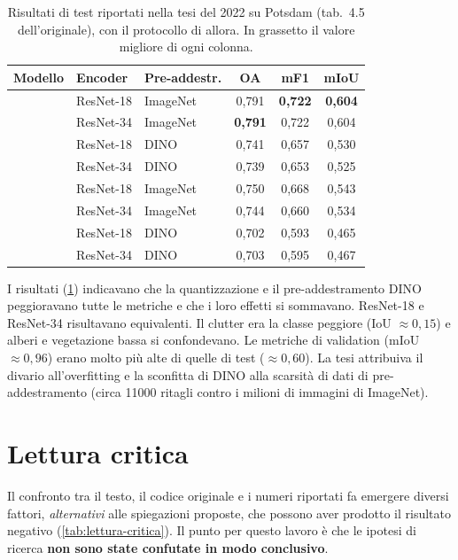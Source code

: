 \begin{table}[t]
  \centering
  \small
  \caption[Risultati di test della tesi del 2022]{Risultati di test riportati nella tesi del
    2022 su Potsdam (tab.~4.5 dell'originale), con il protocollo di allora. In grassetto il
    valore migliore di ogni colonna.}
  \label{tab:risultati-2022}
  \begin{tabular}{|l|l|l|c|c|c|}
    \hline
    \textbf{Modello} & \textbf{Encoder} & \textbf{Pre-addestr.} & \textbf{OA} & \textbf{mF1} & \textbf{mIoU} \\
    \hline
    \maresunet{}   & ResNet-18 & ImageNet & 0,791 & \textbf{0,722} & \textbf{0,604} \\
    \maresunet{}   & ResNet-34 & ImageNet & \textbf{0,791} & 0,722 & 0,604 \\
    \maresunet{}   & ResNet-18 & DINO     & 0,741 & 0,657 & 0,530 \\
    \maresunet{}   & ResNet-34 & DINO     & 0,739 & 0,653 & 0,525 \\
    \maresunetvq{} & ResNet-18 & ImageNet & 0,750 & 0,668 & 0,543 \\
    \maresunetvq{} & ResNet-34 & ImageNet & 0,744 & 0,660 & 0,534 \\
    \maresunetvq{} & ResNet-18 & DINO     & 0,702 & 0,593 & 0,465 \\
    \maresunetvq{} & ResNet-34 & DINO     & 0,703 & 0,595 & 0,467 \\
    \hline
  \end{tabular}
\end{table}

I risultati (\cref{tab:risultati-2022}) indicavano che la quantizzazione e il pre-addestramento
DINO peggioravano tutte le metriche e che i loro effetti si sommavano. ResNet-18 e ResNet-34
risultavano equivalenti. Il clutter era la classe peggiore (IoU $\approx 0{,}15$) e alberi e
vegetazione bassa si confondevano. Le metriche di validation (mIoU $\approx 0{,}96$) erano
molto più alte di quelle di test ($\approx 0{,}60$). La tesi attribuiva il divario
all'overfitting e la sconfitta di DINO alla scarsità di dati di pre-addestramento (circa
\num{11000} ritagli contro i milioni di immagini di ImageNet).

\section{Lettura critica}
\label{sec:lettura-critica}

Il confronto tra il testo, il codice originale e i numeri riportati fa emergere diversi
fattori, \emph{alternativi} alle spiegazioni proposte, che possono aver prodotto il risultato
negativo (\cref{tab:lettura-critica}). Il punto per questo lavoro è che le ipotesi di ricerca
\textbf{non sono state confutate in modo conclusivo}.


